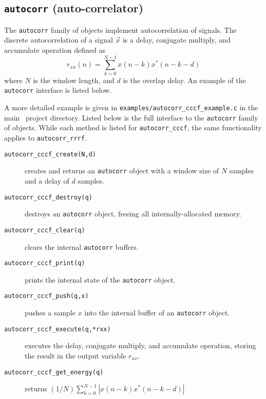 \subsection{{\tt autocorr} (auto-correlator)}
\label{module:filter:autocorr}
The {\tt autocorr} family of objects implement autocorrelation of
signals.
The discrete autocorrelation of a signal $\vec{x}$
is a delay, conjugate multiply, and accumulate operation defined as
%
\begin{equation}
\label{eqn:filter:autocorr}
    r_{xx}(n) = \sum_{k=0}^{N-1} {x(n-k)x^*(n-k-d)}
\end{equation}
%
where $N$ is the window length, and $d$ is the overlap delay.
An example of the {\tt autocorr} interface is listed below.
%

%
A more detailed example is given in
{\tt examples/autocorr\_cccf\_example.c}
in the main \liquid\ project directory.
%
Listed below is the full interface to the {\tt autocorr} family of
objects.
While each method is listed for {\tt autocorr\_cccf}, the same
functionality applies to {\tt autocorr\_rrrf}.
%
\begin{description}
\item[{\tt autocorr\_cccf\_create(N,d)}]
    creates and returns an {\tt autocorr} object with a window size of
    $N$ samples and a delay of $d$ samples.
\item[{\tt autocorr\_cccf\_destroy(q)}]
    destroys an {\tt autocorr} object, freeing all internally-allocated
    memory.
\item[{\tt autocorr\_cccf\_clear(q)}]
    clears the internal {\tt autocorr} buffers.
\item[{\tt autocorr\_cccf\_print(q)}]
    prints the internal state of the {\tt autocorr} object.
\item[{\tt autocorr\_cccf\_push(q,x)}]
    pushes a sample $x$ into the internal buffer of an {\tt autocorr}
    object.
\item[{\tt autocorr\_cccf\_execute(q,*rxx)}]
    executes the delay, conjugate multiply, and accumulate operation,
    storing the result in the output variable $r_{xx}$.
\item[{\tt autocorr\_cccf\_get\_energy(q)}]
    returns $(1/N)\sum_{k=0}^{N-1}{|x(n-k)x^*(n-k-d)|}$
\end{description}



% 
%
